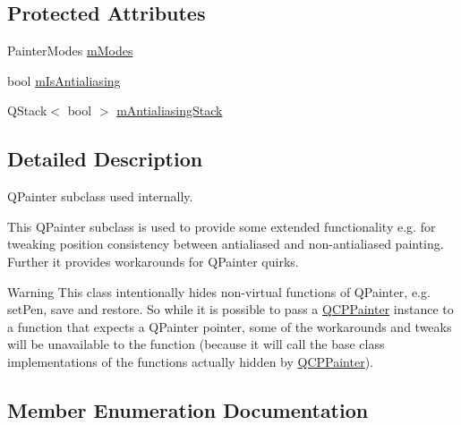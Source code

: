 \subsection*{Protected Attributes}
\begin{DoxyCompactItemize}
\item 
Painter\+Modes \hyperlink{classQCPPainter_af5d1d6e5df0adbc7de5633250fb3396c}{m\+Modes}
\item 
bool \hyperlink{classQCPPainter_a7055085da176aee0f6b23298f1003d08}{m\+Is\+Antialiasing}
\item 
Q\+Stack$<$ bool $>$ \hyperlink{classQCPPainter_a0189e641bbf7dc31ac15aef7b36501fa}{m\+Antialiasing\+Stack}
\end{DoxyCompactItemize}


\subsection{Detailed Description}
Q\+Painter subclass used internally. 

This Q\+Painter subclass is used to provide some extended functionality e.\+g. for tweaking position consistency between antialiased and non-\/antialiased painting. Further it provides workarounds for Q\+Painter quirks.

\begin{DoxyWarning}{Warning}
This class intentionally hides non-\/virtual functions of Q\+Painter, e.\+g. set\+Pen, save and restore. So while it is possible to pass a \hyperlink{classQCPPainter}{Q\+C\+P\+Painter} instance to a function that expects a Q\+Painter pointer, some of the workarounds and tweaks will be unavailable to the function (because it will call the base class implementations of the functions actually hidden by \hyperlink{classQCPPainter}{Q\+C\+P\+Painter}). 
\end{DoxyWarning}


\subsection{Member Enumeration Documentation}
